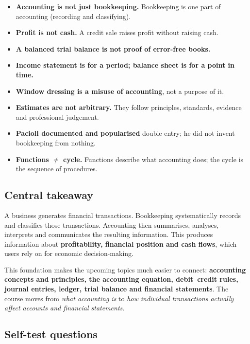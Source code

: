 \documentclass[11pt,a4paper]{article}
\begin{document}
\begin{impbox}
\begin{itemize}
  \item \textbf{Accounting is not just bookkeeping.} Bookkeeping is one part of accounting
        (recording and classifying).
  \item \textbf{Profit is not cash.} A credit sale raises profit without raising cash.
  \item \textbf{A balanced trial balance is not proof of error-free books.}
  \item \textbf{Income statement is for a period; balance sheet is for a point in time.}
  \item \textbf{Window dressing is a misuse of accounting}, not a purpose of it.
  \item \textbf{Estimates are not arbitrary.} They follow principles, standards, evidence and
        professional judgement.
  \item \textbf{Pacioli documented and popularised} double entry; he did not invent bookkeeping from nothing.
  \item \textbf{Functions $\neq$ cycle.} Functions describe what accounting does; the cycle is the
        sequence of procedures.
\end{itemize}
\end{impbox}

\subsection{Central takeaway}

\begin{keybox}
A business generates financial transactions. Bookkeeping systematically records and classifies those
transactions. Accounting then summarises, analyses, interprets and communicates the resulting
information. This produces information about \textbf{profitability, financial position and cash
flows}, which users rely on for economic decision-making.
\end{keybox}

This foundation makes the upcoming topics much easier to connect: \textbf{accounting concepts and
principles, the accounting equation, debit--credit rules, journal entries, ledger, trial balance and
financial statements}. The course moves from \emph{what accounting is} to \emph{how individual
transactions actually affect accounts and financial statements}.

\subsection{Self-test questions}
\end{document}
